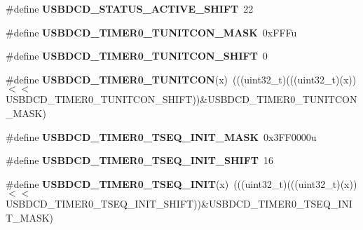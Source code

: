 \begin{DoxyCompactItemize}
\item 
\#define {\bfseries U\+S\+B\+D\+C\+D\+\_\+\+S\+T\+A\+T\+U\+S\+\_\+\+A\+C\+T\+I\+V\+E\+\_\+\+S\+H\+I\+FT}~22\hypertarget{group__USBDCD__Register__Masks_ga77f2a6e381b526f9d70e13cdf21332a5}{}\label{group__USBDCD__Register__Masks_ga77f2a6e381b526f9d70e13cdf21332a5}

\item 
\#define {\bfseries U\+S\+B\+D\+C\+D\+\_\+\+T\+I\+M\+E\+R0\+\_\+\+T\+U\+N\+I\+T\+C\+O\+N\+\_\+\+M\+A\+SK}~0x\+F\+F\+Fu\hypertarget{group__USBDCD__Register__Masks_ga21cf0206b969eecd876b5b612ca33f9e}{}\label{group__USBDCD__Register__Masks_ga21cf0206b969eecd876b5b612ca33f9e}

\item 
\#define {\bfseries U\+S\+B\+D\+C\+D\+\_\+\+T\+I\+M\+E\+R0\+\_\+\+T\+U\+N\+I\+T\+C\+O\+N\+\_\+\+S\+H\+I\+FT}~0\hypertarget{group__USBDCD__Register__Masks_ga4a35e4b1c280e2a888b8505ab2009370}{}\label{group__USBDCD__Register__Masks_ga4a35e4b1c280e2a888b8505ab2009370}

\item 
\#define {\bfseries U\+S\+B\+D\+C\+D\+\_\+\+T\+I\+M\+E\+R0\+\_\+\+T\+U\+N\+I\+T\+C\+ON}(x)~(((uint32\+\_\+t)(((uint32\+\_\+t)(x))$<$$<$U\+S\+B\+D\+C\+D\+\_\+\+T\+I\+M\+E\+R0\+\_\+\+T\+U\+N\+I\+T\+C\+O\+N\+\_\+\+S\+H\+I\+FT))\&U\+S\+B\+D\+C\+D\+\_\+\+T\+I\+M\+E\+R0\+\_\+\+T\+U\+N\+I\+T\+C\+O\+N\+\_\+\+M\+A\+SK)\hypertarget{group__USBDCD__Register__Masks_gad525be70f6473a29d051b39335f48b0c}{}\label{group__USBDCD__Register__Masks_gad525be70f6473a29d051b39335f48b0c}

\item 
\#define {\bfseries U\+S\+B\+D\+C\+D\+\_\+\+T\+I\+M\+E\+R0\+\_\+\+T\+S\+E\+Q\+\_\+\+I\+N\+I\+T\+\_\+\+M\+A\+SK}~0x3\+F\+F0000u\hypertarget{group__USBDCD__Register__Masks_ga2310e6984a2a488e960ca824ddce9ffc}{}\label{group__USBDCD__Register__Masks_ga2310e6984a2a488e960ca824ddce9ffc}

\item 
\#define {\bfseries U\+S\+B\+D\+C\+D\+\_\+\+T\+I\+M\+E\+R0\+\_\+\+T\+S\+E\+Q\+\_\+\+I\+N\+I\+T\+\_\+\+S\+H\+I\+FT}~16\hypertarget{group__USBDCD__Register__Masks_gaa7db9a795f782afd4b38408bc23b4b49}{}\label{group__USBDCD__Register__Masks_gaa7db9a795f782afd4b38408bc23b4b49}

\item 
\#define {\bfseries U\+S\+B\+D\+C\+D\+\_\+\+T\+I\+M\+E\+R0\+\_\+\+T\+S\+E\+Q\+\_\+\+I\+N\+IT}(x)~(((uint32\+\_\+t)(((uint32\+\_\+t)(x))$<$$<$U\+S\+B\+D\+C\+D\+\_\+\+T\+I\+M\+E\+R0\+\_\+\+T\+S\+E\+Q\+\_\+\+I\+N\+I\+T\+\_\+\+S\+H\+I\+FT))\&U\+S\+B\+D\+C\+D\+\_\+\+T\+I\+M\+E\+R0\+\_\+\+T\+S\+E\+Q\+\_\+\+I\+N\+I\+T\+\_\+\+M\+A\+SK)\hypertarget{group__USBDCD__Register__Masks_ga87e981b43bb55f4fdf60d88f85bc31ad}{}\label{group__USBDCD__Register__Masks_ga87e981b43bb55f4fdf60d88f85bc31ad}


\end{DoxyCompactItemize}
